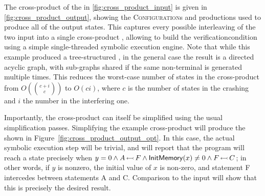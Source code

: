 The cross-product of the {\StateMachines} in
\autoref{fig:cross_product_input} is given in
\autoref{fig:cross_product_output}, showing the
\textsc{Configuration}s and productions used to produce all of the
output states.  This captures every possible interleaving of the two
input {\StateMachines} into a single cross-product {\StateMachine},
allowing {\technique} to build the \gls{verificationcondition} using a
simple single-threaded symbolic execution engine.  Note that while
this example produced a tree-structured {\StateMachine}, in the
general case the result is a directed acyclic graph, with sub-graphs
shared if the same non-terminal is generated multiple times.  This
reduces the worst-case number of states in the cross-product
{\StateMachine} from $O(\binom{c+i}{c})$ to $O(ci)$, where $c$ is the
number of states in the crashing {\StateMachine} and $i$ the number in
the interfering one.

Importantly, the cross-product {\StateMachine} can itself be
simplified using the usual {\StateMachine} simplification passes.
Simplifying the example cross-product {\StateMachine} will produce the
{\StateMachine} shown in Figure~\ref{fig:cross_product_output_opt}.
In this case, the actual symbolic execution step will be trivial, and
will report that the program will reach a {\stCrash} state precisely
when $y = 0 \wedge A\,{\leftarrowtail}\,F \wedge \mathsf{InitMemory}(x) \not= 0 \wedge
F\,{\leftarrowtail}\,C$; in other words, if $y$ is nonzero, the initial
value of $x$ is non-zero, and statement F intercedes between
statements A and C.  Comparison to the input {\StateMachines} will
show that this is precisely the desired result.

